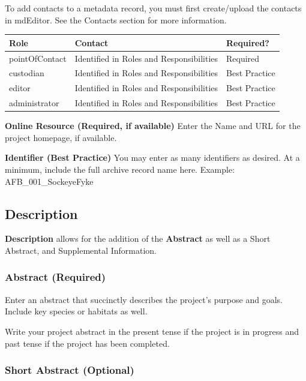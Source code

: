\documentclass[
]{book}
\makeatletter
\newenvironment{kframe}{%
\medskip{}
\setlength{\fboxsep}{.8em}
 \def\at@end@of@kframe{}%
 \ifinner\ifhmode%
  \def\at@end@of@kframe{\end{minipage}}%
  \begin{minipage}{\columnwidth}%
 \fi\fi%
 \def\FrameCommand##1{\hskip\@totalleftmargin \hskip-\fboxsep
 \colorbox{shadecolor}{##1}\hskip-\fboxsep
     \hskip-\linewidth \hskip-\@totalleftmargin \hskip\columnwidth}%
 \MakeFramed {\advance\hsize-\width
   \@totalleftmargin\z@ \linewidth\hsize
   \@setminipage}}%
 {\par\unskip\endMakeFramed%
 \at@end@of@kframe}
\newenvironment{rmdblock}[1]
  {
  \begin{itemize}
  \renewcommand{\labelitemi}{
    \raisebox{-.7\height}[0pt][0pt]{
      {\setkeys{Gin}{width=3em,keepaspectratio}\texttt{[image: images/\#1]}}
    }
  }
  \setlength{\fboxsep}{1em}
  \begin{kframe}
  \item
  }
  {
  \end{kframe}
  \end{itemize}
  }
\newenvironment{rmdtip}
  {\begin{rmdblock}{tip}}
  {\end{rmdblock}}
\makeatother
\begin{document}
\begin{rmdtip}
To add contacts to a metadata record, you must first create/upload the
contacts in mdEditor. See the Contacts section for more information.
\end{rmdtip}

\begin{longtable}[]{@{}lll@{}}
\toprule
Role & Contact & Required?\tabularnewline
\midrule
\endhead
pointOfContact & Identified in Roles and Responsibilities & Required\tabularnewline
custodian & Identified in Roles and Responsibilities & Best Practice\tabularnewline
editor & Identified in Roles and Responsibilities & Best Practice\tabularnewline
administrator & Identified in Roles and Responsibilities & Best Practice\tabularnewline
\bottomrule
\end{longtable}

\textbf{Online Resource (Required, if available)}
Enter the Name and URL for the project homepage, if available.

\textbf{Identifier (Best Practice)}
You may enter as many identifiers as desired. At a minimum, include the full archive record name here. Example: AFB\_001\_SockeyeFyke

\hypertarget{description}{%
\subsection*{Description}\label{description}}

\textbf{Description} allows for the addition of the \textbf{Abstract} as well as a Short Abstract, and Supplemental Information.

\hypertarget{abstract-required}{%
\subsubsection*{Abstract (Required)}\label{abstract-required}}

Enter an abstract that succinctly describes the project's purpose and goals. Include key species or habitats as well.

\begin{rmdtip}
Write your project abstract in the present tense if the project is in
progress and past tense if the project has been completed.
\end{rmdtip}

\hypertarget{short-abstract-optional}{%
\subsubsection*{Short Abstract (Optional)}\label{short-abstract-optional}}
\end{document}
